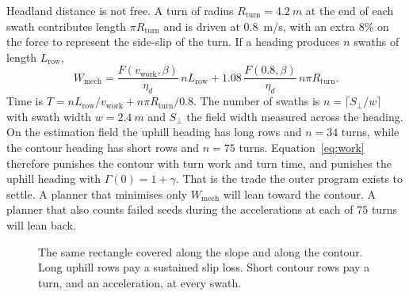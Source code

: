 Headland distance is not free. A turn of radius \(R_{\mathrm{turn}}=\SI{4.2}{m}\) at the end of each swath contributes length \(\pi R_{\mathrm{turn}}\) and is driven at \SI{0.8}{m/s}, with an extra \num{8}\% on the force to represent the side-slip of the turn. If a heading produces \(n\) swaths of length \(L_{\mathrm{row}}\),
\begin{equation}
\label{eq:work}
W_{\mathrm{mech}} = \frac{F(v_{\mathrm{work}},\beta)}{\eta_d}\, n L_{\mathrm{row}} + 1.08\,\frac{F(0.8,\beta)}{\eta_d}\, n\pi R_{\mathrm{turn}}.
\end{equation}
Time is \(T = n L_{\mathrm{row}}/v_{\mathrm{work}} + n\pi R_{\mathrm{turn}}/0.8\). The number of swaths is \(n=\lceil S_{\perp}/w\rceil\) with swath width \(w=\SI{2.4}{m}\) and \(S_{\perp}\) the field width measured across the heading. On the estimation field the uphill heading has long rows and \(n=34\) turns, while the contour heading has short rows and \(n=75\) turns. Equation~\eqref{eq:work} therefore punishes the contour with turn work and turn time, and punishes the uphill heading with \(\Gamma(0)=1+\gamma\). That is the trade the outer program exists to settle. A planner that minimises only \(W_{\mathrm{mech}}\) will lean toward the contour. A planner that also counts failed seeds during the accelerations at each of \(75\) turns will lean back.

\begin{figure}[ht]
\centering
{}
\caption{The same rectangle covered along the slope and along the contour. Long uphill rows pay a sustained slip loss. Short contour rows pay a turn, and an acceleration, at every swath.}
\label{fig:field}
\end{figure}

